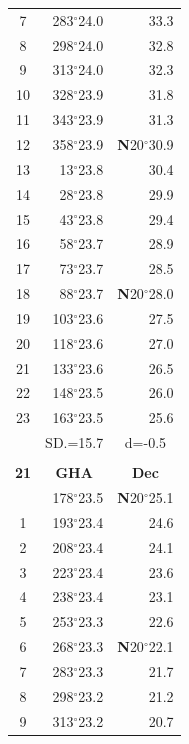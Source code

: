 \documentclass[10pt, a4paper]{report}
\begin{document}
\begin{scriptsize}
\begin{tabular*}{0.2\textwidth}[t]{@{\extracolsep{\fill}}|c|rr|}
7 & 283$^\circ$24.0 & 33.3\\
8 & 298$^\circ$24.0 & 32.8\\
9 & 313$^\circ$24.0 & \raisebox{0.24ex}{\boldmath$\cdot$~\boldmath$\cdot$~~}32.3\\
10 & 328$^\circ$23.9 & 31.8\\
11 & 343$^\circ$23.9 & 31.3\\[2Pt]
12 & 358$^\circ$23.9 & \textbf{N}20$^\circ$30.9\\
13 & 13$^\circ$23.8 & 30.4\\
14 & 28$^\circ$23.8 & 29.9\\
15 & 43$^\circ$23.8 & \raisebox{0.24ex}{\boldmath$\cdot$~\boldmath$\cdot$~~}29.4\\
16 & 58$^\circ$23.7 & 28.9\\
17 & 73$^\circ$23.7 & 28.5\\[2Pt]
18 & 88$^\circ$23.7 & \textbf{N}20$^\circ$28.0\\
19 & 103$^\circ$23.6 & 27.5\\
20 & 118$^\circ$23.6 & 27.0\\
21 & 133$^\circ$23.6 & \raisebox{0.24ex}{\boldmath$\cdot$~\boldmath$\cdot$~~}26.5\\
22 & 148$^\circ$23.5 & 26.0\\
23 & 163$^\circ$23.5 & 25.6\\
\hline
\rule{0pt}{2.4ex} & \multicolumn{1}{c}{SD.=15.7} & \multicolumn{1}{c|}{d=-0.5}\\
\hline
\multicolumn{1}{c}{}\\[-0.5ex]\hline
\multicolumn{1}{|c|}{\rule{0pt}{2.6ex}\textbf{21}} & \multicolumn{1}{c}{\textbf{GHA}} & \multicolumn{1}{c|}{\textbf{Dec}}\\
\hline\rule{0pt}{2.6ex}\noindent
0 & 178$^\circ$23.5 & \textbf{N}20$^\circ$25.1\\
1 & 193$^\circ$23.4 & 24.6\\
2 & 208$^\circ$23.4 & 24.1\\
3 & 223$^\circ$23.4 & \raisebox{0.24ex}{\boldmath$\cdot$~\boldmath$\cdot$~~}23.6\\
4 & 238$^\circ$23.4 & 23.1\\
5 & 253$^\circ$23.3 & 22.6\\[2Pt]
6 & 268$^\circ$23.3 & \textbf{N}20$^\circ$22.1\\
7 & 283$^\circ$23.3 & 21.7\\
8 & 298$^\circ$23.2 & 21.2\\
9 & 313$^\circ$23.2 & \raisebox{0.24ex}{\boldmath$\cdot$~\boldmath$\cdot$~~}20.7\\

\end{tabular*}
\end{scriptsize}
\end{document}
